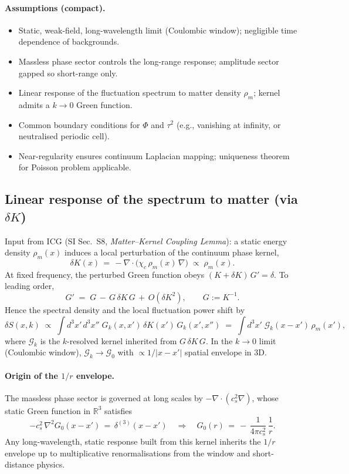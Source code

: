 \documentclass[11pt]{article}
\begin{document}
\paragraph{Assumptions (compact).}
\begin{itemize}[leftmargin=*]
  \item Static, weak-field, long-wavelength limit (Coulombic window); negligible time dependence of backgrounds.
  \item Massless phase sector controls the long-range response; amplitude sector gapped so short-range only.
  \item Linear response of the fluctuation spectrum to matter density $\rho_m$; kernel admits a $k\to0$ Green function.
  \item Common boundary conditions for $\Phi$ and $\tau^2$ (e.g., vanishing at infinity, or neutralised periodic cell).
  \item Near-regularity ensures continuum Laplacian mapping; uniqueness theorem for Poisson problem applicable.
\end{itemize}

\subsection*{Linear response of the spectrum to matter (via $\delta K$)}
Input from ICG (SI Sec.~S8, \emph{Matter--Kernel Coupling Lemma}): a static energy density $\rho_m(x)$ induces a local perturbation of the continuum phase kernel,
\begin{equation}
  \delta K(x) \,=\, -\nabla\!\cdot\big(\chi_c\,\rho_m(x)\,\nabla\big) \;\propto\; \rho_m(x).
\end{equation}
At fixed frequency, the perturbed Green function obeys $(K+\delta K)\,G' = \delta$. To leading order,
\begin{equation}
  G' \;=\; G \, -\, G\,\delta K\, G \,+\, O(\delta K^2),\qquad G:=K^{-1}.
\end{equation}
Hence the spectral density and the local fluctuation power shift by
\begin{equation}
  \delta S(x,k) \;\propto\; \int d^3x'\,d^3x''\; G_k(x,x')\,\delta K(x')\, G_k(x',x'') \;=\; \int d^3x'\; \mathcal G_k(x-x')\, \rho_m(x'),
\end{equation}
where $\mathcal G_k$ is the $k$-resolved kernel inherited from $G\,\delta K\,G$. In the $k\to 0$ limit (Coulombic window), $\mathcal G_k\to \mathcal G_0$ with $\propto 1/|x-x'|$ spatial envelope in 3D.

\paragraph{Origin of the $1/r$ envelope.} The massless phase sector is governed at long scales by $-\nabla\!\cdot(c_s^2\nabla)$, whose static Green function in $\mathbb R^3$ satisfies
\begin{equation}
  -c_s^2\, \nabla^2 G_0(x-x') \,=\, \delta^{(3)}(x-x')\quad \Rightarrow\quad G_0(r) \,=\, -\,\frac{1}{4\pi c_s^2}\, \frac{1}{r}.
\end{equation}
Any long-wavelength, static response built from this kernel inherits the $1/r$ envelope up to multiplicative renormalisations from the window and short-distance physics.
\end{document}
